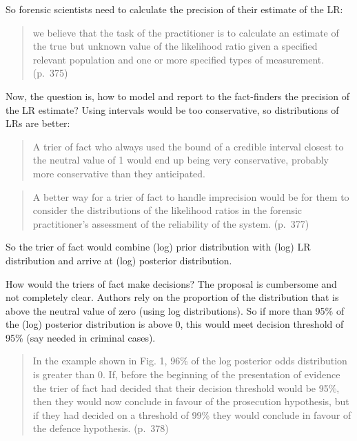 \documentclass[
  10pt,
  dvipsnames,enabledeprecatedfontcommands]{scrartcl}
\begin{document}
\noindent So forensic scientists need to calculate the precision of
their estimate of the LR:

\begin{quote}
we believe that the task of the practitioner is to calculate an estimate
of the true but unknown value of the likelihood ratio given a specified
relevant population and one or more specified types of measurement.
(p.~375)
\end{quote}

\noindent Now, the question is, how to model and report to the
fact-finders the precision of the LR estimate? Using intervals would be
too conservative, so distributions of LRs are better:

\begin{quote}
A trier of fact who always used the bound of a credible interval closest
to the neutral value of 1 would end up being very conservative, probably
more conservative than they anticipated.
\end{quote}

\begin{quote}
A better way for a trier of fact to handle imprecision would be for them
to consider the distributions of the likelihood ratios in the forensic
practitioner's assessment of the reliability of the system. (p.~377)
\end{quote}

\noindent So the trier of fact would combine (log) prior distribution
with (log) LR distribution and arrive at (log) posterior distribution.

\vspace{3mm}

\noindent How would the triers of fact make decisions? The proposal is
cumbersome and not completely clear. Authors rely on the proportion of
the distribution that is above the neutral value of zero (using log
distributions). So if more than 95\% of the (log) posterior distribution
is above 0, this would meet decision threshold of 95\% (say needed in
criminal cases).

\begin{quote}
In the example shown in Fig. 1, 96\% of the log posterior odds
distribution is greater than 0. If, before the beginning of the
presentation of evidence the trier of fact had decided that their
decision threshold would be 95\%, then they would now conclude in favour
of the prosecution hypothesis, but if they had decided on a threshold of
99\% they would conclude in favour of the defence hypothesis. (p.~378)
\end{quote}
\end{document}
